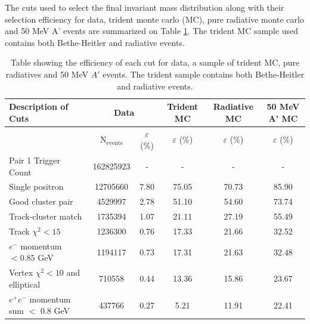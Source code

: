 The cuts used to select the final invariant mass distribution along with their
selection efficiency for data, trident monte carlo (MC), pure radiative 
monte carlo and 50 MeV A' events are summarized on Table \ref{tab:sel_eff}.
The trident MC sample used contains both Bethe-Heitler and radiative events.

\begin{table}
    \centering
    \begin{tabular}{l||c|c|c|c|c}
        \toprule
        \textbf{Description of Cuts} 
        & \multicolumn{2}{c|}{\textbf{Data}}
        & \textbf{Trident MC}
        & \textbf{Radiative MC}
        & \textbf{50 MeV A' MC} \\
        \midrule
        \midrule
        & N$_{\text{events}}$ & $\varepsilon$ (\%)
        & $\varepsilon$ (\%) 
        & $\varepsilon$ (\%)
        & $\varepsilon$ (\%) \\ 
        \midrule
        \midrule
        Pair 1 Trigger Count & 162825923 & -  & - & - & - \\
        Single positron & 12705660 & 7.80  & 75.05 & 70.73 & 85.90 \\
        Good cluster pair & 4529997 & 2.78  & 51.10 & 54.60 & 73.74 \\
        Track-cluster match & 1735394 & 1.07  & 21.11 & 27.19 &55.49 \\
        Track $\chi^2 < 15$ &1236300  & 0.76  &17.33  & 21.66 &32.52  \\
        $e^-$ momentum $ < 0.85$ GeV & 1194117 & 0.73  & 17.31 & 21.63 &32.48  \\
        Vertex $\chi^2 < 10$ and elliptical &710558  & 0.44  &13.36  & 15.86& 23.67 \\
        $e^+e^-$ momentum sum $<$ 0.8 GeV & 437766 & 0.27   & 5.21 & 11.91 &22.41  \\
        \bottomrule
    \end{tabular}
    \caption{Table showing the efficiency of each cut for data, a sample of 
             trident MC, pure radiatives and 50 MeV $A'$ events.  The trident sample
             contains both Bethe-Heitler and radiative events.}
    \label{tab:sel_eff}
\end{table}

